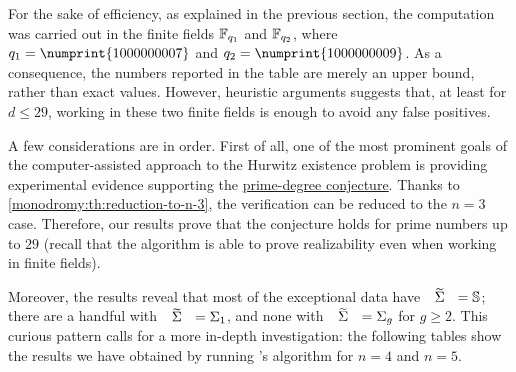 \bgroup
\setlength{\tabcolsep}{1.5em}
\egroup

\begin{remark}
For the sake of efficiency, as explained in the previous section, the computation was carried out in the finite fields $\mathbb{F}_{q_1}$ and $\mathbb{F}_{q_2}$, where $q_1=\numprint{1000000007}$ and $q_2=\numprint{1000000009}$. As a consequence, the numbers reported in the table are merely an upper bound, rather than exact values. However, heuristic arguments suggests that, at least for $d\le 29$, working in these two finite fields is enough to avoid any false positives.
\end{remark}

A few considerations are in order. First of all, one of the most prominent goals of the computer-assisted approach to the Hurwitz existence problem is providing experimental evidence supporting the \hyperref[prime-degree-conjecture]{prime-degree conjecture}. Thanks to \cref{monodromy:th:reduction-to-n-3}, the verification can be reduced to the $n=3$ case. Therefore, our results prove that the conjecture holds for prime numbers up to $29$ (recall that the algorithm is able to prove realizability even when working in finite fields).

Moreover, the results reveal that most of the exceptional data have $\tSigma=\sphere{}$; there are a handful with $\tSigma=\surf{1}$, and none with $\tSigma=\surf{g}$ for $g\ge 2$. This curious pattern calls for a more in-depth investigation: the following tables show the results we have obtained by running \citeauthor{zheng}'s algorithm for $n=4$ and $n=5$.

\bgroup
\setlength{\tabcolsep}{1.5em}

